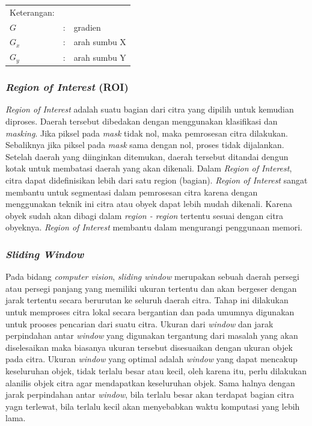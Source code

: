 \noindent
\renewcommand{\arraystretch}{1}
\begin{tabularx}{\textwidth}{lll}
	\hline
	Keterangan: \\
	$G$ & : & gradien\\
	$G_{x}$ & : & arah sumbu X\\
	$G_{y}$ & : & arah sumbu Y\\
	\hline
\end{tabularx}
\vspace{4.5pt}

\subsubsection{\textit{Region of Interest} (ROI)}
\textit{Region   of  Interest}   adalah  suatu   bagian   dari   citra   yang   dipilih   untuk kemudian  diproses. Daerah  tersebut  dibedakan  dengan  menggunakan klasifikasi dan \textit{masking}.  Jika  piksel pada   \textit{mask}  tidak   nol,   maka   pemrosesan   citra   dilakukan. Sebaliknya jika piksel pada \textit{mask} sama dengan nol, proses tidak dijalankan. Setelah  daerah yang diinginkan ditemukan, daerah  tersebut  ditandai dengun kotak  untuk  membatasi  daerah  yang akan  dikenali. Dalam  \textit{Region  of  Interest}, citra  dapat  didefinisikan lebih  dari  satu  region (bagian). \textit{Region  of Interest}  sangat membantu untuk  segmentasi dalam  pemrosesan citra karena  dengan  menggunakan teknik  ini  citra  atau  obyek  dapat  lebih mudah dikenali. Karena obyek sudah akan dibagi dalam \textit{region - region} tertentu  sesuai dengan citra obyeknya. \textit{Region  of  Interest} membantu dalam mengurangi penggunaan memori.\\

\subsubsection{\textit{Sliding Window}}
Pada bidang \textit{computer vision}, \textit{sliding window} merupakan sebuah daerah persegi atau persegi panjang yang memiliki ukuran tertentu dan akan bergeser dengan jarak tertentu secara berurutan ke seluruh daerah citra. Tahap ini dilakukan untuk memproses citra lokal secara bergantian dan pada umumnya digunakan untuk prooses pencarian dari suatu citra. Ukuran dari \textit{window} dan jarak perpindahan antar \textit{window} yang digunakan tergantung dari masalah yang akan diselesaikan maka biasanya ukuran tersebut disesuaikan dengan ukuran objek pada citra. Ukuran \textit{window} yang optimal adalah \textit{window} yang dapat mencakup keseluruhan objek, tidak terlalu besar atau kecil, oleh karena itu, perlu dilakukan alanilis objek citra agar mendapatkan keseluruhan objek. Sama halnya dengan jarak perpindahan antar \textit{window}, bila terlalu besar akan terdapat bagian citra yagn terlewat, bila terlalu kecil akan menyebabkan waktu komputasi yang lebih lama. 

